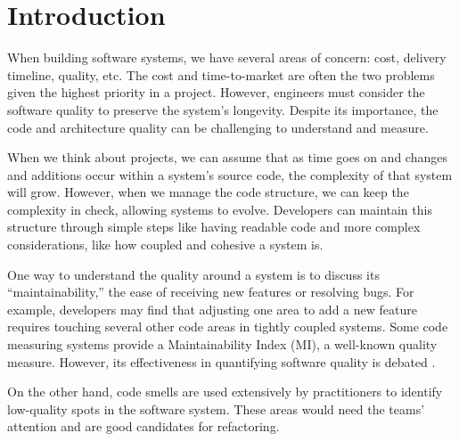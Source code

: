 \chapter{Introduction} \label{sectionIntroduction}


When building software systems, we have several areas of concern: cost, delivery timeline, quality, etc. The cost and time-to-market are often the two problems given the highest priority in a project. However, engineers must consider the software quality to preserve the system's longevity. Despite its importance, the code and architecture quality can be challenging to understand and measure.

When we think about projects, we can assume that as time goes on and changes and additions occur within a system's source code, the complexity of that system will grow. However, when we manage the code structure, we can keep the complexity in check, allowing systems to evolve. Developers can maintain this structure through simple steps like having readable code and more complex considerations, like how coupled and cohesive a system is.

One way to understand the quality around a system is to discuss its ``maintainability,'' the ease of receiving new features or resolving bugs. For example, developers may find that adjusting one area to add a new feature requires touching several other code areas in tightly coupled systems. Some code measuring systems provide a Maintainability Index (MI), a well-known quality measure. However, its effectiveness in quantifying software quality is debated \cite{vandeursen:2014}.

On the other hand, code smells are used extensively by practitioners to identify low-quality spots in the software system. These areas would need the teams' attention and are good candidates for refactoring.

